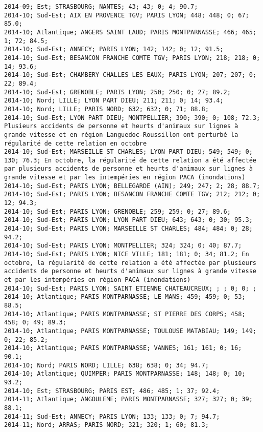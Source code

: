\documentclass{article}
\begin{document}
\begin{Verbatim}[commandchars=\\\{\}]
2014-09; Est; STRASBOURG; NANTES; 43; 43; 0; 4; 90.7; 
2014-10; Sud-Est; AIX EN PROVENCE TGV; PARIS LYON; 448; 448; 0; 67; 85.0; 
2014-10; Atlantique; ANGERS SAINT LAUD; PARIS MONTPARNASSE; 466; 465; 1; 72; 84.5; 
2014-10; Sud-Est; ANNECY; PARIS LYON; 142; 142; 0; 12; 91.5; 
2014-10; Sud-Est; BESANCON FRANCHE COMTE TGV; PARIS LYON; 218; 218; 0; 14; 93.6; 
2014-10; Sud-Est; CHAMBERY CHALLES LES EAUX; PARIS LYON; 207; 207; 0; 22; 89.4; 
2014-10; Sud-Est; GRENOBLE; PARIS LYON; 250; 250; 0; 27; 89.2; 
2014-10; Nord; LILLE; LYON PART DIEU; 211; 211; 0; 14; 93.4; 
2014-10; Nord; LILLE; PARIS NORD; 632; 632; 0; 71; 88.8; 
2014-10; Sud-Est; LYON PART DIEU; MONTPELLIER; 390; 390; 0; 108; 72.3; Plusieurs accidents de personne et heurts d'animaux sur lignes à grande vitesse et en région Languedoc-Roussillon ont perturbé la régularité de cette relation en octobre
2014-10; Sud-Est; MARSEILLE ST CHARLES; LYON PART DIEU; 549; 549; 0; 130; 76.3; En octobre, la régularité de cette relation a été affectée par plusieurs accidents de personne et heurts d'animaux sur lignes à grande vitesse et par les intempéries en région PACA (inondations)
2014-10; Sud-Est; PARIS LYON; BELLEGARDE (AIN); 249; 247; 2; 28; 88.7; 
2014-10; Sud-Est; PARIS LYON; BESANCON FRANCHE COMTE TGV; 212; 212; 0; 12; 94.3; 
2014-10; Sud-Est; PARIS LYON; GRENOBLE; 259; 259; 0; 27; 89.6; 
2014-10; Sud-Est; PARIS LYON; LYON PART DIEU; 643; 643; 0; 30; 95.3; 
2014-10; Sud-Est; PARIS LYON; MARSEILLE ST CHARLES; 484; 484; 0; 28; 94.2; 
2014-10; Sud-Est; PARIS LYON; MONTPELLIER; 324; 324; 0; 40; 87.7; 
2014-10; Sud-Est; PARIS LYON; NICE VILLE; 181; 181; 0; 34; 81.2; En octobre, la régularité de cette relation a été affectée par plusieurs accidents de personne et heurts d'animaux sur lignes à grande vitesse et par les intempéries en région PACA (inondations)
2014-10; Sud-Est; PARIS LYON; SAINT ETIENNE CHATEAUCREUX; ; ; 0; 0; ; 
2014-10; Atlantique; PARIS MONTPARNASSE; LE MANS; 459; 459; 0; 53; 88.5; 
2014-10; Atlantique; PARIS MONTPARNASSE; ST PIERRE DES CORPS; 458; 458; 0; 49; 89.3; 
2014-10; Atlantique; PARIS MONTPARNASSE; TOULOUSE MATABIAU; 149; 149; 0; 22; 85.2; 
2014-10; Atlantique; PARIS MONTPARNASSE; VANNES; 161; 161; 0; 16; 90.1; 
2014-10; Nord; PARIS NORD; LILLE; 638; 638; 0; 34; 94.7; 
2014-10; Atlantique; QUIMPER; PARIS MONTPARNASSE; 148; 148; 0; 10; 93.2; 
2014-10; Est; STRASBOURG; PARIS EST; 486; 485; 1; 37; 92.4; 
2014-11; Atlantique; ANGOULEME; PARIS MONTPARNASSE; 327; 327; 0; 39; 88.1; 
2014-11; Sud-Est; ANNECY; PARIS LYON; 133; 133; 0; 7; 94.7; 
2014-11; Nord; ARRAS; PARIS NORD; 321; 320; 1; 60; 81.3; 

\end{Verbatim}
\end{document}
